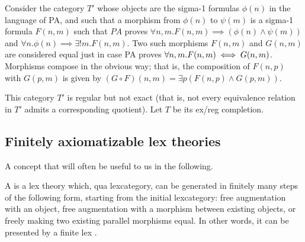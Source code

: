 \begin{construction}
Consider the category $T'$ whose objects are the sigma-1 formulas $\phi(n)$ in the language of PA, and such that a morphism from $\phi(n)$ to $\psi(m)$ is a sigma-1 formula $F(n, m)$ such that $PA$ proves $\forall n, m . F(n, m) \implies (\phi(n) \wedge \psi(m))$ and $\forall n . \phi(n) \implies \exists! m . F(n, m)$. Two such morphisms $F(n, m)$ and $G(n, m)$ are considered equal just in case PA proves $\forall n, m . F(n, m) \iff G(n, m)$. Morphisms compose in the obvious way; that is, the composition of $F(n, p)$ with $G(p, m)$ is given by $(G \circ F)(n, m) = \exists p (F(n, p) \wedge G(p, m))$.

This category $T'$ is regular but not exact (that is, not every equivalence relation in $T'$ admits a corresponding quotient). Let $T$ be its ex/reg completion.

\end{construction}


\subsection{Finitely axiomatizable lex theories}
A concept that will often be useful to us in the following.

\begin{definition}
A  is a lex theory which, qua lexcategory, can be generated in finitely many steps of the following form, starting from the initial lexcategory: free augmentation with an object, free augmentation with a morphism between existing objects, or freely making two existing parallel morphisms equal. In other words, it can be presented by a finite lex . 
\end{definition}

